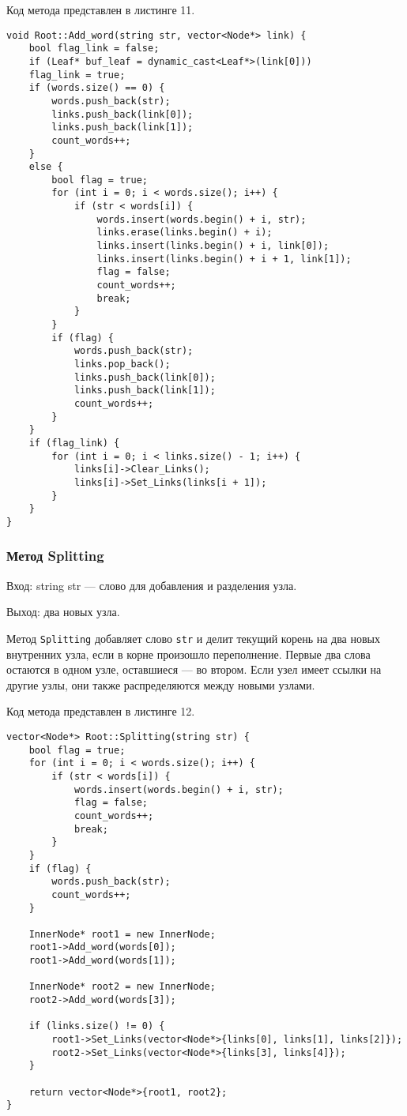\documentclass[10pt,a4paper,final]{article} %
\begin{document}
Код метода представлен в листинге 11. \begin{lstlisting}[label=addWordWithLinksMethod, caption = Метод Add\_word (с добавлением ссылок)] 
void Root::Add_word(string str, vector<Node*> link) {
	bool flag_link = false;
	if (Leaf* buf_leaf = dynamic_cast<Leaf*>(link[0]))
	flag_link = true;
	if (words.size() == 0) {
		words.push_back(str);
		links.push_back(link[0]);
		links.push_back(link[1]);
		count_words++;
	}
	else {
		bool flag = true;
		for (int i = 0; i < words.size(); i++) {
			if (str < words[i]) {
				words.insert(words.begin() + i, str);
				links.erase(links.begin() + i);
				links.insert(links.begin() + i, link[0]);
				links.insert(links.begin() + i + 1, link[1]);
				flag = false;
				count_words++;
				break;
			}
		}
		if (flag) {
			words.push_back(str);
			links.pop_back();
			links.push_back(link[0]);
			links.push_back(link[1]);
			count_words++;
		}
	}
	if (flag_link) {
		for (int i = 0; i < links.size() - 1; i++) {
			links[i]->Clear_Links();
			links[i]->Set_Links(links[i + 1]);
		}
	}
}\end{lstlisting}


\subsubsection{Метод Splitting}
Вход: string str — слово для добавления и разделения узла. \par
Выход: два новых узла. \par
\par Метод \texttt{Splitting} добавляет слово \texttt{str} и делит текущий корень на два новых внутренних узла, если в корне произошло переполнение. Первые два слова остаются в одном узле, оставшиеся — во втором. Если узел имеет ссылки на другие узлы, они также распределяются между новыми узлами.

Код метода представлен в листинге 12. \begin{lstlisting}[label=splittingMethod, caption = Метод Splitting]
vector<Node*> Root::Splitting(string str) {
	bool flag = true;
	for (int i = 0; i < words.size(); i++) {
		if (str < words[i]) {
			words.insert(words.begin() + i, str);
			flag = false;
			count_words++;
			break;
		}
	}
	if (flag) {
		words.push_back(str);
		count_words++;
	}
	
	InnerNode* root1 = new InnerNode;
	root1->Add_word(words[0]);
	root1->Add_word(words[1]);
	
	InnerNode* root2 = new InnerNode;
	root2->Add_word(words[3]);
	
	if (links.size() != 0) {
		root1->Set_Links(vector<Node*>{links[0], links[1], links[2]});
		root2->Set_Links(vector<Node*>{links[3], links[4]});
	}
	
	return vector<Node*>{root1, root2};
} \end{lstlisting}
\end{document}
